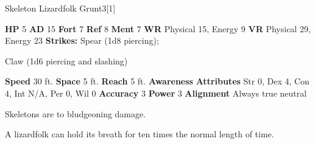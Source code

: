       
  \begin{monsubsection}{Skeleton Lizardfolk Grunt}{3}[1]
    \vspace{-1em}\vspace{-1em}
    \vspace{0em}

    
    

    \begin{spellcontent}
      \begin{spelltargetinginfo}
        \pari \textbf{HP} 5 \monsep
          \textbf{AD} 15 \monsep
          \textbf{Fort} 7 \monsep
          \textbf{Ref} 8 \monsep
          \textbf{Ment} 7
        \pari \textbf{WR} Physical 15, Energy 9 \monsep
        \textbf{VR} Physical 29, Energy 23
        \pari \textbf{Strikes:}
            Spear  (1d8 piercing);
\par Claw  (1d6 piercing and slashing)
      \end{spelltargetinginfo}
    \end{spellcontent}
    \begin{monsterfooter}
      \pari \textbf{Speed} 30 ft. \monsep
        \textbf{Space} 5 ft. \monsep
        \textbf{Reach} 5 ft.
      \pari \textbf{Awareness} 
      \pari \textbf{Attributes}
        Str 0, Dex 4,
        Con 4, Int N/A,
        Per 0, Wil 0
      \pari \textbf{Accuracy} 3 \monsep
        \textbf{Power} 3
      \pari \textbf{Alignment} Always true neutral
    \end{monsterfooter}
  \end{monsubsection}
          Skeletons are  to bludgeoning damage.
        
     A lizardfolk can hold its breath for ten times the normal length of time.
  

